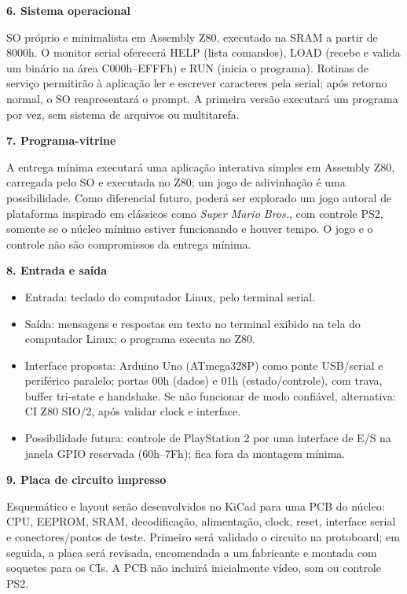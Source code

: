 \documentclass[10pt,a4paper]{article}
\newcommand{\field}[2]{\par\vspace{4pt}\noindent\textbf{#1. #2}\par\nopagebreak[4]}
\begin{document}
\field{6}{Sistema operacional} SO próprio e minimalista em Assembly Z80, executado na SRAM a partir de 8000h. O monitor serial oferecerá HELP (lista comandos), LOAD (recebe e valida um binário na área C000h--EFFFh) e RUN (inicia o programa). Rotinas de serviço permitirão à aplicação ler e escrever caracteres pela serial; após retorno normal, o SO reapresentará o prompt. A primeira versão executará um programa por vez, sem sistema de arquivos ou multitarefa.

\begin{samepage}
\field{7}{Programa-vitrine} A entrega mínima executará uma aplicação interativa simples em Assembly Z80, carregada pelo SO e executada no Z80; um jogo de adivinhação é uma possibilidade. Como diferencial futuro, poderá ser explorado um jogo autoral de plataforma inspirado em clássicos como \textit{Super Mario Bros.}, com controle PS2, somente se o núcleo mínimo estiver funcionando e houver tempo. O jogo e o controle não são compromissos da entrega mínima.

\field{8}{Entrada e saída}
\begin{itemize}
\item Entrada: teclado do computador Linux, pelo terminal serial.
\item Saída: mensagens e respostas em texto no terminal exibido na tela do computador Linux; o programa executa no Z80.
\item Interface proposta: Arduino Uno (ATmega328P) como ponte USB/serial e periférico paralelo; portas 00h (dados) e 01h (estado/controle), com trava, buffer tri-state e handshake. Se não funcionar de modo confiável, alternativa: CI Z80 SIO/2, após validar clock e interface.
\item Possibilidade futura: controle de PlayStation 2 por uma interface de E/S na janela GPIO reservada (60h--7Fh); fica fora da montagem mínima.
\end{itemize}
\end{samepage}

\field{9}{Placa de circuito impresso} Esquemático e layout serão desenvolvidos no KiCad para uma PCB do núcleo: CPU, EEPROM, SRAM, decodificação, alimentação, clock, reset, interface serial e conectores/pontos de teste. Primeiro será validado o circuito na protoboard; em seguida, a placa será revisada, encomendada a um fabricante e montada com soquetes para os CIs. A PCB não incluirá inicialmente vídeo, som ou controle PS2.
\end{document}
